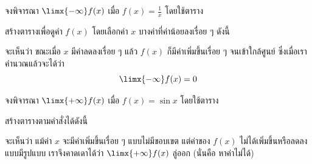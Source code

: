 \begin{frame}[t]
\begin{ex}
จงพิจารณา $\limx{-\infty} f(x)$ เมื่อ $f(x) = \frac{1}{x}$ โดยใช้ตาราง
\end{ex}
\begin{sol}
 สร้างตารางเพื่อดูค่า $f(x)$ โดยเลือกค่า $x$ บางค่าที่ค่าน้อยลงเรื่อย ๆ ดังนี้
\begin{table}[h!]
\centering
{}
\end{table}\pa

จะเห็นว่า ขณะเมื่อ $x$ มีค่าลดลงเรื่อย ๆ แล้ว $f(x)$ ก็มีค่าเพิ่มขึ้นเรื่อย ๆ จนเข้าใกล้ศูนย์ \pa ซึ่งเมื่อเราคำนวณแล้วจะได้ว่า
\[ \limx{-\infty} f(x) = 0 \]
\end{sol}
\end{frame}

\begin{frame}[t]
\begin{ex}
จงพิจารณา $\limx{+\infty} f(x)$ เมื่อ $f(x) = \sin x$ โดยใช้ตาราง
\end{ex}
\begin{sol}
สร้างตารางตามคำสั่งได้ดังนี้
\begin{table}[h!]
\centering
{}
\end{table}\pa

จะเห็นว่า แม้ค่า $x$ จะมีค่าเพิ่มขึ้นเรื่อย ๆ แบบไม่มีขอบเขต แต่ค่าของ $f(x)$ ไม่ได้เพิ่มขึ้นหรือลดลงแบบมีรูปแบบ เราจึงคาดเดาได้ว่า $\limx{+\infty} f(x)$ ลู่ออก (นั่นคือ หาค่าไม่ได้)
\end{sol}
\end{frame}

